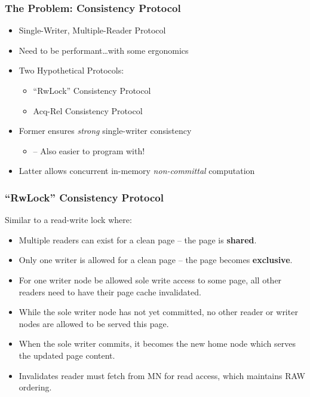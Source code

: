 \documentclass{beamer}
\begin{document}
\begin{frame}
    \frametitle{The Problem: Consistency Protocol}
    \begin{itemize}
        \item Single-Writer, Multiple-Reader Protocol
        \item Need to be performant\dots with some ergonomics
        \item {
            Two Hypothetical Protocols:
            \begin{itemize}
                \item ``RwLock'' Consistency Protocol
                \item Acq-Rel Consistency Protocol
            \end{itemize}
        }
        \item {
            Former ensures \emph{strong} single-writer consistency
            \begin{itemize}
                \item -- Also easier to program with!
            \end{itemize}
        }
        \item Latter allows concurrent in-memory \emph{non-committal} computation
    \end{itemize}
\end{frame}

\begin{frame}
    \frametitle{``RwLock'' Consistency Protocol}
    Similar to a read-write lock where:
    \begin{itemize}
        \item Multiple readers can exist for a clean page -- the page is \textbf{shared}.
        \item Only one writer is allowed for a clean page -- the page becomes \textbf{exclusive}.
        \item {
            For one writer node be allowed sole write access to some page, all other
            readers need to have their page cache invalidated.
        }
        \item {
            While the sole writer node has not yet committed, no other reader or writer nodes
            are allowed to be served this page.
        }
        \item {
            When the sole writer commits, it becomes the new home node which serves the
            updated page content.
        }
        \item {
            Invalidates reader must fetch from MN for read access, which maintains RAW ordering.
        }
    \end{itemize}
\end{frame}
\end{document}
